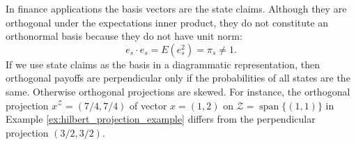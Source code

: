 \documentclass[\topdir/lecture\_notes.tex]{subfiles}
\begin{document}
In finance applications the basis vectors are the state claims. Although they are orthogonal under the expectations inner product, they do not constitute an orthonormal basis because they do not have unit norm:
\begin{equation*}
e_{s} \cdot e_{s}=E(e_{s}^{2})=\pi_{s} \neq 1. 
\end{equation*}
If we use state claims as the basis in a diagrammatic representation, then orthogonal payoffs are perpendicular only if the probabilities of all states are the same. Otherwise orthogonal projections are skewed. For instance, the orthogonal projection \(x^{\mathcal{Z}}=(7/4, 7/4)\) of vector \(x=(1,2)\) on \(\mathcal{Z}=\operatorname{span}\{(1,1)\}\) in Example \ref{ex:hilbert_projection_example} differs from the perpendicular projection $(3/2, 3/2)$.
\end{document}
